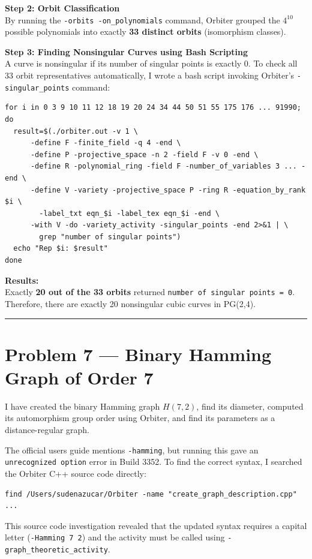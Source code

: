 \documentclass[12pt,a4paper]{article}
\begin{document}
\vspace{0.3cm}\noindent\textbf{Step 2: Orbit Classification}\\
By running the \texttt{-orbits -on\_polynomials} command, Orbiter grouped the $4^{10}$ possible polynomials into exactly \textbf{33 distinct orbits} (isomorphism classes).

\vspace{0.3cm}\noindent\textbf{Step 3: Finding Nonsingular Curves using Bash Scripting}\\
A curve is nonsingular if its number of singular points is exactly 0. To check all 33 orbit representatives automatically, I wrote a bash script invoking Orbiter's \texttt{-singular\_points} command:

\begin{verbatim}
for i in 0 3 9 10 11 12 18 19 20 24 34 44 50 51 55 175 176 ... 91990; do
  result=$(./orbiter.out -v 1 \
      -define F -finite_field -q 4 -end \
      -define P -projective_space -n 2 -field F -v 0 -end \
      -define R -polynomial_ring -field F -number_of_variables 3 ... -end \
      -define V -variety -projective_space P -ring R -equation_by_rank $i \
        -label_txt eqn_$i -label_tex eqn_$i -end \
      -with V -do -variety_activity -singular_points -end 2>&1 | \
        grep "number of singular points")
  echo "Rep $i: $result"
done
\end{verbatim}

\textbf{Results:}\\
Exactly \textbf{20 out of the 33 orbits} returned \texttt{number of singular points = 0}. Therefore, there are exactly 20 nonsingular cubic curves in PG(2,4).

\vspace{0.5cm}
\hrule
\vspace{0.5cm}

\section*{Problem 7 --- Binary Hamming Graph of Order 7}

I have created the binary Hamming graph $H(7,2)$, find its diameter, computed its automorphism group order using Orbiter, and find its parameters as a distance-regular graph.

The official users guide mentions \texttt{-hamming}, but running this gave an \texttt{unrecognized option} error in Build 3352. To find the correct syntax, I searched the Orbiter C++ source code directly:
\begin{verbatim}
find /Users/sudenazucar/Orbiter -name "create_graph_description.cpp" ...
\end{verbatim}
This source code investigation revealed that the updated syntax requires a capital letter (\texttt{-Hamming 7 2}) and the activity must be called using \texttt{-graph\_theoretic\_activity}.
\end{document}
